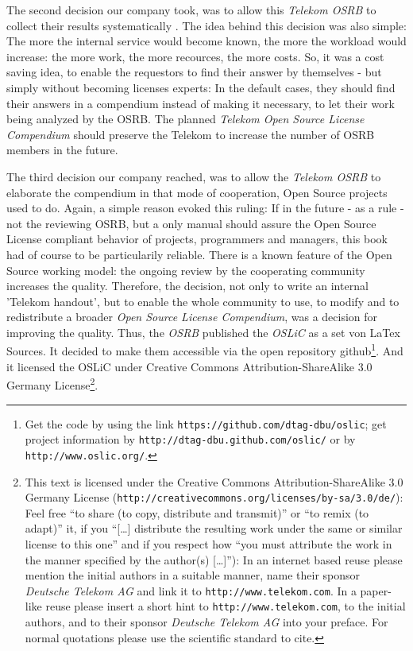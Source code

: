 The second decision our company took, was to allow this \emph{Telekom OSRB} to
collect their results systematically . The idea behind this decision was also
simple: The more the internal service would become known, the more the workload
would increase: the more work, the more recources, the more costs. So, it was a
cost saving idea, to enable the requestors to find their answer by themselves -
but simply without becoming licenses experts: In the default cases, they should
find their answers in a compendium instead of making it necessary, to let their
work being analyzed by the OSRB. The planned \emph{Telekom Open Source License
Compendium} should preserve the Telekom to increase the number of OSRB members in
the future.

The third decision our company reached, was to allow the \emph{Telekom OSRB} to
elaborate the compendium in that mode of cooperation, Open Source projects used
to do. Again, a simple reason evoked this ruling: If in the future - as a rule -
not the reviewing OSRB, but a only manual should assure the Open Source License
compliant behavior of projects, programmers and managers, this book had of
course to be particularily reliable. There is a known feature of the Open Source
working model: the ongoing review by the cooperating community increases the
quality. Therefore, the decision, not only to write an internal 'Telekom
handout', but to enable the whole community to use, to modify and to
redistribute a broader \emph{Open Source License Compendium}, was a decision for
improving the quality. Thus, the \emph{OSRB} published the \emph{OSLiC} as a set
von LaTex Sources. It decided to make them accessible via the open repository
github\footnote{Get the code by using the link
\texttt{https://github.com/dtag-dbu/oslic}; get project information by
\texttt{http://dtag-dbu.github.com/oslic/} or by
\texttt{http://www.oslic.org/}.}. And it licensed the OSLiC under Creative
Commons Attribution-ShareAlike 3.0 Germany License\footnote{ This text is
licensed under the Creative Commons Attribution-ShareAlike 3.0 Germany License
(\texttt{http://creativecommons.org/licenses/by-sa/3.0/de/}): Feel free
\enquote{to share (to copy, distribute and transmit)} or \enquote{to remix (to
adapt)} it, if you \enquote{[\ldots] distribute the resulting work under the
same or similar license to this one} and if you respect how \enquote{you must
attribute the work in the manner specified by the author(s) [\ldots]}):
In an internet based reuse please mention the initial authors in a suitable
manner, name their sponsor \textit{Deutsche Telekom AG} and link it to
\texttt{http://www.telekom.com}. In a paper-like reuse please insert a short
hint to \texttt{http://www.telekom.com}, to the initial authors, and to their
sponsor \textit{Deutsche Telekom AG} into your preface. For normal quotations
please use the scientific standard to cite.}.

